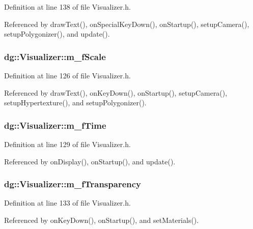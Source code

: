 Definition at line 138 of file Visualizer.h.

Referenced by draw\-Text(), on\-Special\-Key\-Down(), on\-Startup(), setup\-Camera(), setup\-Polygonizer(), and update().
\subsubsection{ dg::Visualizer::m\_\-f\-Scale\hspace{0.3cm}{\tt  [protected]}}\label{classdg_1_1Visualizer_n24}




Definition at line 126 of file Visualizer.h.

Referenced by draw\-Text(), on\-Key\-Down(), on\-Startup(), setup\-Camera(), setup\-Hypertexture(), and setup\-Polygonizer().
\subsubsection{ dg::Visualizer::m\_\-f\-Time\hspace{0.3cm}{\tt  [protected]}}\label{classdg_1_1Visualizer_n27}




Definition at line 129 of file Visualizer.h.

Referenced by on\-Display(), on\-Startup(), and update().
\subsubsection{ dg::Visualizer::m\_\-f\-Transparency\hspace{0.3cm}{\tt  [protected]}}\label{classdg_1_1Visualizer_n29}




Definition at line 133 of file Visualizer.h.

Referenced by on\-Key\-Down(), on\-Startup(), and set\-Materials().
